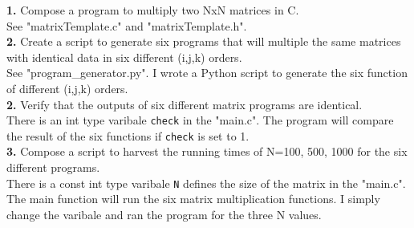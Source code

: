 \documentclass{article}
\begin{document}
\textbf{1.} Compose a program to multiply two NxN matrices in C.\\
\indent See "matrixTemplate.c" and "matrixTemplate.h".\\

\textbf{2.} Create a script to generate six programs that will multiple the same matrices with identical data in six different (i,j,k) orders.\\
\indent See "program\_generator.py". I wrote a Python script to generate the six function of different (i,j,k) orders.\\

\textbf{2.} Verify that the outputs of six different matrix programs are identical.\\
\indent There is an int type varibale \texttt{check} in the "main.c". The program will compare the result of the six functions if \texttt{check} is set to 1.\\

\textbf{3.} Compose a script to harvest the running times of N=100, 500, 1000 for the six different programs.\\
\indent There is a const int type varibale \texttt{N} defines the size of the matrix in the "main.c". The main function will run the six matrix multiplication functions. I simply change the varibale and ran the program for the three N values.\\
\end{document}
